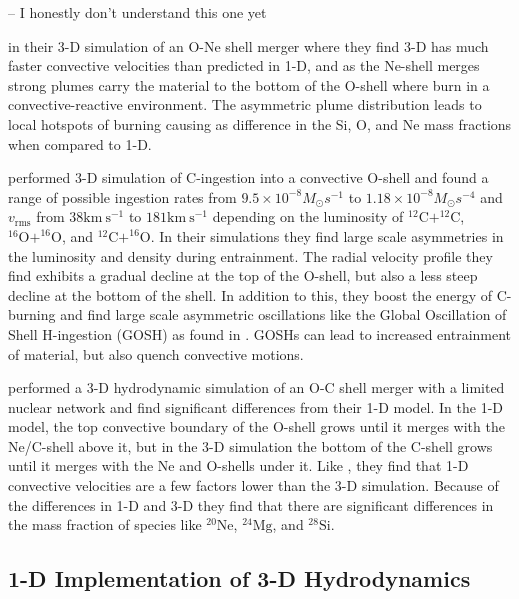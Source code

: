 \cite{arnett3DSimulationsMLT2019} -- I honestly don't understand this one yet

\cite{yadavLargescaleMixingViolent2020a} in their 3-D simulation of an O-Ne shell merger where they find 3-D has much faster convective velocities than predicted in 1-D, and as the Ne-shell merges strong plumes carry the material to the bottom of the O-shell where burn in a convective-reactive environment.
The asymmetric plume distribution leads to local hotspots of burning causing as difference in the Si, O, and Ne mass fractions when compared to 1-D.

\cite{andrassy3DHydrodynamicSimulations2020} performed 3-D simulation of C-ingestion into a convective O-shell and found a range of possible ingestion rates from $9.5\times10^{-8} M_\odot s^{-1}$ to $1.18\times10^{-8} M_\odot s^{-4}$ and $v_{\mathrm{rms}}$ from $38 \mathrm{km~s^{-1}}$ to $181 \mathrm{km~s^{-1}}$ depending on the luminosity of $^{12}\mathrm{C}+^{12}\mathrm{C}$, $^{16}\mathrm{O}+^{16}\mathrm{O}$, and $^{12}\mathrm{C}+^{16}\mathrm{O}$.
In their simulations they find large scale asymmetries in the luminosity and density during entrainment.
The radial velocity profile they find exhibits a gradual decline at the top of the O-shell, but also a less steep decline at the bottom of the shell.
In addition to this, they boost the energy of C-burning and find large scale asymmetric oscillations like the Global Oscillation of Shell H-ingestion (GOSH) as found in \cite{herwigGLOBALNONSPHERICALOSCILLATIONS2014}.
GOSHs can lead to increased entrainment of material, but also quench convective motions.

\cite{rizzutiShellMergersLate2024a} performed a 3-D hydrodynamic simulation of an O-C shell merger with a limited nuclear network and find significant differences from their 1-D model.
In the 1-D model, the top convective boundary of the O-shell grows until it merges with the Ne/C-shell above it, but in the 3-D simulation the bottom of the C-shell grows until it merges with the Ne and O-shells under it.
Like \cite{jonesIdealizedHydrodynamicSimulations2017}, they find that 1-D convective velocities are a few factors lower than the 3-D simulation.
Because of the differences in 1-D and 3-D they find that there are significant differences in the mass fraction of species like $^{20}\mathrm{Ne}$, $^{24}\mathrm{Mg}$, and $^{28}\mathrm{Si}$.

\subsection{1-D Implementation of 3-D Hydrodynamics}\label{sec:intro_1dimplementof3d}

